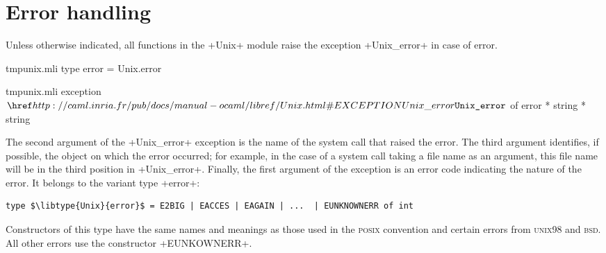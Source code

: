 \section{Error handling}

Unless otherwise indicated, all functions in the \ml+Unix+ module
raise the exception \ml+Unix_error+ in case of error.
%
\begin{codefile}{tmpunix.mli}
type error = Unix.error
\end{codefile}
%
\begin{listingcodefile}{tmpunix.mli}
exception $\libexn{Unix}{Unix\_error}$ of error * string * string
\end{listingcodefile}
%
The second argument of the \ml+Unix_error+ exception is the name of
the system call that raised the error. The third argument identifies,
if possible, the object on which the error occurred; for example, in
the case of a system call taking a file name as an argument, this file name will be
in the third position in \ml+Unix_error+. Finally, the first argument
of the exception is an error code indicating the nature of the
error. It belongs to the variant type \ml+error+:
%
\begin{lstlisting}
type $\libtype{Unix}{error}$ = E2BIG | EACCES | EAGAIN | ...  | EUNKNOWNERR of int
\end{lstlisting}
%
Constructors of this type have the same names and meanings as those
used in the \textsc{posix} convention and  certain errors from
\textsc{unix98} and \textsc{bsd}. All other errors use the constructor \ml+EUNKOWNERR+.

